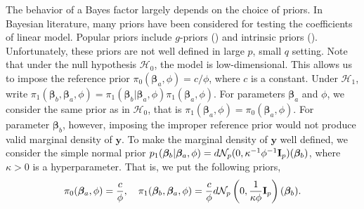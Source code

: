 \documentclass[bj]{imsart}
\newcommand{\By}{\mathbf{y}}    \newcommand{\Bz}{\mathbf{z}}
\newcommand{\bfsym}[1]{\ensuremath{\boldsymbol{#1}}}
\def\bbeta{\bfsym \beta}
\theoremstyle{plain}
\theoremstyle{definition}
\theoremstyle{remark}
\begin{document}
The behavior of a Bayes factor largely depends on the choice of priors.
In Bayesian literature, many priors have been considered for testing the coefficients of linear model.
Popular priors include $g$-priors (\citep{Liang2008Mixtures}) and intrinsic priors (\citep{Casella2006Obj}).
Unfortunately, these priors are not well defined in large $p$, small $q$ setting.
Note that under the null hypothesis $\mathcal H_0$, the model is low-dimensional.
This allows us to impose the reference prior $\pi_0 (\bbeta_a,\phi)=c/\phi$, where $c$ is a constant.
Under $\mathcal H_1$,
write $\pi_1(\bbeta_b,\bbeta_a,\phi)=\pi_1(\bbeta_b|\bbeta_a,\phi) \pi_1(\bbeta_a,\phi)$.
For parameters $\bbeta_a $ and $\phi$, we consider the same prior as in $\mathcal H_0$, that is $\pi_1(\bbeta_a,\phi)=\pi_0(\bbeta_a,\phi)$.
For parameter $\bbeta_b$, however, imposing the improper reference prior would not produce valid marginal density of $\By$.
To make the marginal density of $\By$ well defined,
we consider the simple normal prior $p_1(\bbeta_b|\bbeta_a, \phi) = d \mathcal N_{p} (0, \kappa^{-1} \phi^{-1} \BI_{p}) (\bbeta_b) $, where $\kappa>0$ is a hyperparameter.
That is, we put the following priors,
\begin{equation}\label{priors}
    \pi_0(\bbeta_a,\phi)= \frac{c}{\phi},\quad
    \pi_1(\bbeta_b,\bbeta_a,\phi)=\frac{c}{\phi} d \mathcal N_{p} \left(0, \frac{1}{\kappa \phi} \BI_{p}\right) (\bbeta_b).
\end{equation}
\end{document}
